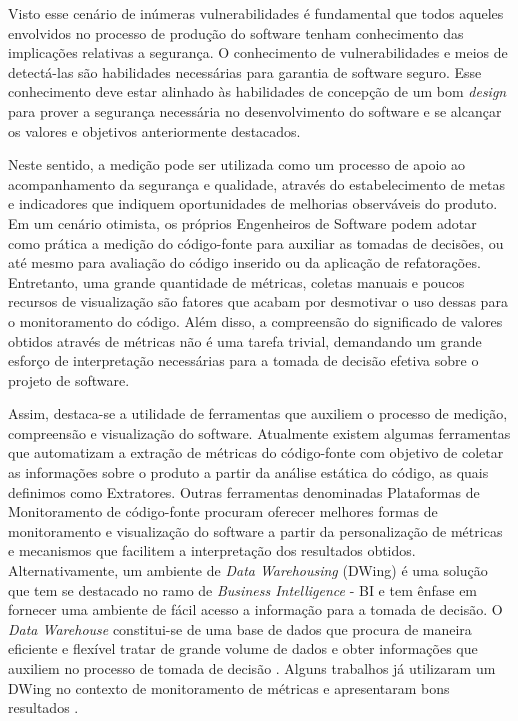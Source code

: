 Visto esse cenário de inúmeras vulnerabilidades é fundamental que todos aqueles envolvidos no processo de produção do software tenham conhecimento das implicações relativas a segurança.
%
O conhecimento de vulnerabilidades e meios de detectá-las são habilidades necessárias para garantia de software seguro.
%
Esse conhecimento deve estar alinhado às habilidades de concepção de um bom \emph{design} para prover a segurança necessária no desenvolvimento do software e se alcançar os valores e objetivos anteriormente destacados.


Neste sentido, a medição pode ser utilizada como um processo de apoio ao acompanhamento da segurança e qualidade, através do estabelecimento de metas e indicadores que indiquem oportunidades de melhorias observáveis do produto.
%
Em um cenário otimista, os próprios Engenheiros de Software podem adotar como prática a medição do código-fonte para auxiliar as tomadas de decisões, ou até mesmo para avaliação do código inserido ou da aplicação de refatorações.
%
Entretanto, uma grande quantidade de métricas, coletas manuais e poucos recursos de visualização são fatores que acabam por desmotivar o uso dessas para o monitoramento do código.
%
Além disso, a compreensão do significado de valores obtidos através de métricas não é uma tarefa trivial, demandando um grande esforço de interpretação necessárias para a tomada de decisão efetiva sobre o projeto de software.


Assim, destaca-se a utilidade de ferramentas que auxiliem o processo de medição, compreensão e visualização do software.
%
Atualmente existem algumas ferramentas que automatizam a extração de métricas do código-fonte com objetivo de coletar as informações sobre o produto a partir da análise estática do código, as quais definimos como Extratores.
%
Outras ferramentas denominadas Plataformas de Monitoramento de código-fonte procuram oferecer melhores formas de monitoramento e visualização do software a partir da personalização de métricas e mecanismos que facilitem a interpretação dos resultados obtidos.
%
Alternativamente, um ambiente de \emph{Data Warehousing} (DWing) é uma solução que tem se destacado no ramo de \emph{Business Intelligence} - BI e tem ênfase em fornecer uma ambiente de fácil acesso a informação para a tomada de decisão. O \emph{Data Warehouse} constitui-se de uma base de dados que procura de maneira eficiente e flexível tratar de grande volume de dados e obter informações que auxiliem no processo de tomada de decisão \cite{lopes2007}. Alguns trabalhos já utilizaram um  DWing no contexto de monitoramento de métricas e apresentaram bons resultados  \cite{Castellanos2005} \cite{Folleco2007} \cite{Silveira2010}\cite{mazuco2011} \cite{rego2014}.

